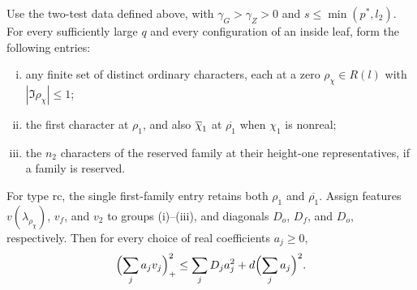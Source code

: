 \begin{theorem}\label{thm:twotest}
Use the two-test data defined above, with $\gamma_G>\gamma_Z>0$ and
$s\le\min(p^*,l_2)$. For every sufficiently large $q$ and every configuration of an
inside leaf, form the following entries:
\begin{enumerate}[(i)]
  \item any finite set of distinct ordinary characters, each at a zero
    $\rho_\chi\in R(l)$ with $|\Im\rho_\chi|\le1$;
  \item the first character at $\rho_1$, and also $\overline{\chi}_1$ at $\overline{\rho_1}$ when
    $\chi_1$ is nonreal;
  \item the $n_2$ characters of the reserved family at their height-one representatives,
    if a family is reserved.
\end{enumerate}
For type $\mathrm{rc}$, the single first-family entry retains both $\rho_1$ and
$\overline{\rho_1}$. Assign features $v(\lambda_{\rho_\chi})$, $v_f$, and $v_2$ to
groups (i)--(iii), and diagonals $D_o$, $D_f$, and $D_o$, respectively. Then
for every choice of real coefficients $a_j\ge0$,
\[
  \Bigl(\sum_ja_jv_j\Bigr)_+^2\le\sum_jD_ja_j^2+d\Bigl(\sum_ja_j\Bigr)^2 .
\]
\end{theorem}

